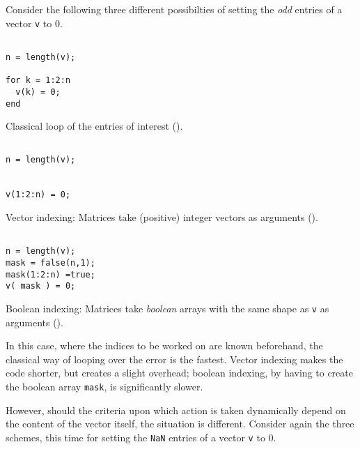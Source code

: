 Consider the following three different possibilties of setting the \emph{odd}
entries of a vector \lstinline!v! to $0$.

\hfill
\begin{minipage}[t]{.29\textwidth}
\begin{lstlisting}[framerule=1pt,rulecolor=\color{goodgreen}]
% [...] create v

n = length(v);

for k = 1:2:n
  v(k) = 0;
end
\end{lstlisting}
Classical loop of the entries of interest ().
\end{minipage}
\hfill
\begin{minipage}[t]{.29\textwidth}
\begin{lstlisting}[framerule=1pt,rulecolor=\color{mediocre}]
% [...] create v

n = length(v);


v(1:2:n) = 0;

\end{lstlisting}
Vector indexing: Matrices take (positive) integer vectors as arguments
().
\end{minipage}
\hfill
\begin{minipage}[t]{.29\textwidth}
\begin{lstlisting}[framerule=1pt,rulecolor=\color{badred}]
% [...] create v

n = length(v);
mask = false(n,1);
mask(1:2:n) =true;
v( mask ) = 0;

\end{lstlisting}
Boolean indexing: Matrices take \emph{boolean} arrays\footnotemark{} with the
same shape as \lstinline!v! as arguments ().
\end{minipage}
\hfill
{}

In this case, where the indices to be worked on are known beforehand, the
classical way of looping over the error is the fastest. Vector indexing makes
the code shorter, but creates a slight overhead; boolean indexing, by having to
create the boolean array \lstinline!mask!, is significantly slower.

However, should the criteria upon which action is taken dynamically depend on
the content of the vector itself, the situation is different.  Consider again
the three schemes, this time for setting the \lstinline!NaN! entries of a
vector \lstinline!v! to $0$.

